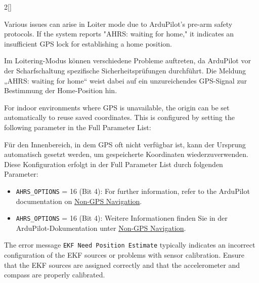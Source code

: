 \begin{paracol}{2}[]
\colende

\renewcommand{\deutschertitel}{Fehlerbehebung und Diagnose}
\renewcommand{\englischertitel}{Troubleshooting and Diagnostics}
\label{TroubleshootingOpticalFlowAndRangefinderAruPilotNoGPS}
\makrounterunterabschnitt

Various issues can arise in Loiter mode due to ArduPilot’s pre-arm safety protocols. If the system reports "AHRS: waiting for home," it indicates an insufficient GPS lock for establishing a home position. 

\colger

Im Loitering-Modus können verschiedene Probleme auftreten, da ArduPilot vor der Scharfschaltung spezifische Sicherheitsprüfungen durchführt. Die Meldung „AHRS: waiting for home“ weist dabei auf ein unzureichendes GPS-Signal zur Bestimmung der Home-Position hin. 

\coleng

For indoor environments where GPS is unavailable, the origin can be set automatically to reuse saved coordinates. This is configured by setting the following parameter in the Full Parameter List:

\colger

Für den Innenbereich, in dem GPS oft nicht verfügbar ist, kann der Ursprung automatisch gesetzt werden, um gespeicherte Koordinaten wiederzuverwenden. Diese Konfiguration erfolgt in der Full Parameter List durch folgenden Parameter:

\coleng

\begin{itemize}
\item \verb!AHRS_OPTIONS! = 16 \quad (Bit 4): For further information, refer to the ArduPilot documentation on \href{https://ardupilot.org/copter/docs/common-non-gps-navigation-landing-page.html}{Non-GPS Navigation}.
\end{itemize}

\colger

\begin{itemize}
\item \verb!AHRS_OPTIONS! = 16 \quad (Bit 4): Weitere Informationen finden Sie in der ArduPilot-Dokumentation unter \href{https://ardupilot.org/copter/docs/common-non-gps-navigation-landing-page.html}{Non-GPS Navigation}.
\end{itemize}

\coleng

The error message \texttt{EKF Need Position Estimate} typically indicates an incorrect configuration of the EKF sources or problems with sensor calibration. Ensure that the EKF sources are assigned correctly and that the accelerometer and compass are properly calibrated.


\end{paracol}
